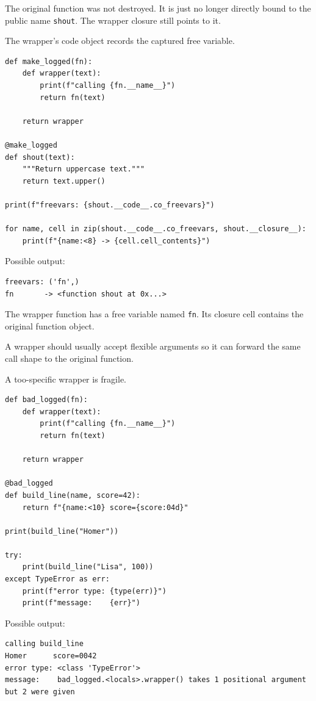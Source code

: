 The original function was not destroyed. It is just no longer directly bound to the public name \texttt{shout}. The wrapper closure still points to it.

The wrapper's code object records the captured free variable.

\begin{verbatim}
def make_logged(fn):
    def wrapper(text):
        print(f"calling {fn.__name__}")
        return fn(text)

    return wrapper

@make_logged
def shout(text):
    """Return uppercase text."""
    return text.upper()

print(f"freevars: {shout.__code__.co_freevars}")

for name, cell in zip(shout.__code__.co_freevars, shout.__closure__):
    print(f"{name:<8} -> {cell.cell_contents}")
\end{verbatim}

Possible output:

\begin{verbatim}
freevars: ('fn',)
fn       -> <function shout at 0x...>
\end{verbatim}

The wrapper function has a free variable named \texttt{fn}. Its closure cell contains the original function object.

A wrapper should usually accept flexible arguments so it can forward the same call shape to the original function.

A too-specific wrapper is fragile.

\begin{verbatim}
def bad_logged(fn):
    def wrapper(text):
        print(f"calling {fn.__name__}")
        return fn(text)

    return wrapper

@bad_logged
def build_line(name, score=42):
    return f"{name:<10} score={score:04d}"

print(build_line("Homer"))

try:
    print(build_line("Lisa", 100))
except TypeError as err:
    print(f"error type: {type(err)}")
    print(f"message:    {err}")
\end{verbatim}

Possible output:

\begin{verbatim}
calling build_line
Homer      score=0042
error type: <class 'TypeError'>
message:    bad_logged.<locals>.wrapper() takes 1 positional argument but 2 were given
\end{verbatim}

